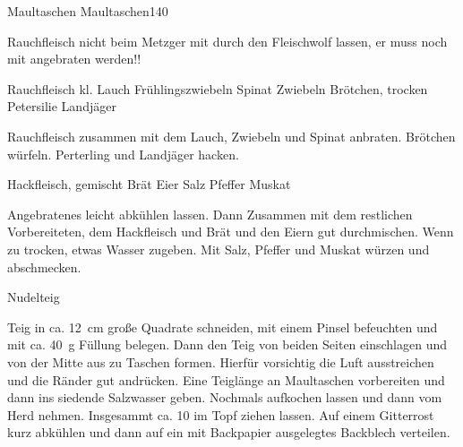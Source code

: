 \begin{MyRecipe}{Maultaschen}{ Maultaschen}{\SI{140}{\minuteprime} }

	
	
Rauchfleisch nicht beim Metzger mit durch den Fleischwolf lassen, er muss noch mit angebraten werden!!\par\bigskip


\ingredient[\Calc{0.25}{\x}]{\si{\kilogram}} {Rauchfleisch}
\ingredient[\Calc{1}{\x}]{} {kl. Lauch}
\ingredient[\Calc{1.5}{\x}]{} {Frühlingszwiebeln}
\ingredient[\Calc{0.3}{\x}]{\si{\kilogram}} {Spinat}
\ingredient[\Calc{2}{\x}]{} {Zwiebeln}
\ingredient[\Calc{3}{\x}]{} {Brötchen, trocken}
\ingredient[\Calc{1}{\x}]{\si{\Bund}} {Petersilie}
 {Landjäger}

Rauchfleisch zusammen mit dem Lauch, Zwiebeln und Spinat anbraten.	Brötchen würfeln. Perterling und Landjäger hacken.\par\bigskip

\ingredient[\Calc{1}{\x}]{\si{\kilogram}} {Hackfleisch, gemischt}
\ingredient[\Calc{0.5}{\x}]{\si{\kilogram}} {Brät}
\ingredient[\Calc{6.5}{\x}]{} {Eier}
\ingredient[]{} {Salz}
\ingredient[]{} {Pfeffer}
\ingredient[]{} {Muskat}

Angebratenes leicht abkühlen lassen. Dann Zusammen mit dem restlichen Vorbereiteten, dem Hackfleisch und Brät und den Eiern gut durchmischen. Wenn zu trocken, etwas Wasser zugeben. Mit Salz, Pfeffer und Muskat würzen und abschmecken.\par\bigskip

\ingredient[\Calc{1.2}{\x}]{\si{\kilogram}} {Nudelteig}
	
Teig in ca. \SI{12}{\centi\meter} große Quadrate schneiden, mit einem Pinsel befeuchten und mit ca. \SI{40}{\gram} Füllung belegen. Dann den Teig von beiden Seiten einschlagen und von der Mitte aus zu Taschen formen. Hierfür vorsichtig die Luft ausstreichen und die Ränder gut andrücken. Eine Teiglänge an Maultaschen vorbereiten und dann ins siedende Salzwasser geben. Nochmals aufkochen lassen und dann vom Herd nehmen. Insgesammt ca. \SI{10}{\minuteprime} im Topf ziehen lassen. Auf einem Gitterrost kurz abkühlen und dann auf ein mit Backpapier ausgelegtes Backblech verteilen.





	
\end{MyRecipe}